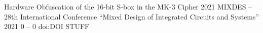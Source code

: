
\begin{cvpublications}

	 {Hardware Obfuscation of the 16-bit S-box in the MK-3 Cipher} {2021 MIXDES -- 28th International Conference ``Mixed Design of Integrated Circuits and Systems''} {2021} {0 -- 0} {doi:DOI STUFF}

\end{cvpublications}
